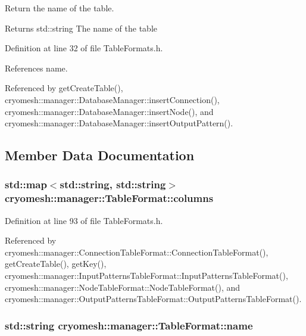 \-Return the name of the table. 

\begin{DoxyReturn}{\-Returns}
std\-::string \-The name of the table 
\end{DoxyReturn}


\-Definition at line 32 of file \-Table\-Formats.\-h.



\-References name.



\-Referenced by get\-Create\-Table(), cryomesh\-::manager\-::\-Database\-Manager\-::insert\-Connection(), cryomesh\-::manager\-::\-Database\-Manager\-::insert\-Node(), and cryomesh\-::manager\-::\-Database\-Manager\-::insert\-Output\-Pattern().



\subsection{\-Member \-Data \-Documentation}
\hypertarget{structcryomesh_1_1manager_1_1TableFormat_a29ab6f4cfc0c56da1fa461ea665a1b61}{
\subsubsection[{columns}]{\setlength{\rightskip}{0pt plus 5cm}std\-::map$<$std\-::string, std\-::string$>$ {\bf cryomesh\-::manager\-::\-Table\-Format\-::columns}}}\label{structcryomesh_1_1manager_1_1TableFormat_a29ab6f4cfc0c56da1fa461ea665a1b61}


\-Definition at line 93 of file \-Table\-Formats.\-h.



\-Referenced by cryomesh\-::manager\-::\-Connection\-Table\-Format\-::\-Connection\-Table\-Format(), get\-Create\-Table(), get\-Key(), cryomesh\-::manager\-::\-Input\-Patterns\-Table\-Format\-::\-Input\-Patterns\-Table\-Format(), cryomesh\-::manager\-::\-Node\-Table\-Format\-::\-Node\-Table\-Format(), and cryomesh\-::manager\-::\-Output\-Patterns\-Table\-Format\-::\-Output\-Patterns\-Table\-Format().

\hypertarget{structcryomesh_1_1manager_1_1TableFormat_ab49912897ccb7fd0f8d42f1cc21332e8}{
\subsubsection[{name}]{\setlength{\rightskip}{0pt plus 5cm}std\-::string {\bf cryomesh\-::manager\-::\-Table\-Format\-::name}}}\label{structcryomesh_1_1manager_1_1TableFormat_ab49912897ccb7fd0f8d42f1cc21332e8}



